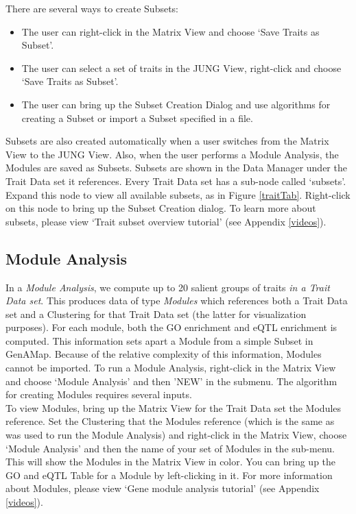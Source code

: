 \documentclass{article}
\begin{document}
There are several ways to create Subsets:

\begin{itemize}
\item The user can right-click in the Matrix View and choose `Save Traits as Subset'. 
\item The user can select a set of traits in the JUNG View, right-click and choose `Save Traits as Subset'. 
\item The user can bring up the Subset Creation Dialog and use algorithms for creating a Subset or import a Subset specified in a file. 
\end{itemize}

Subsets are also created automatically when a user switches from the Matrix View to the JUNG View. Also, when the user performs a Module Analysis, the Modules are saved as Subsets. Subsets are shown in the Data Manager under the Trait Data set it references. Every Trait Data set has a sub-node called `subsets'. Expand this node to view all available subsets, as in Figure \ref{traitTab}. Right-click on this node to bring up the Subset Creation dialog. To learn more about subsets, please view `Trait subset overview tutorial' (see Appendix \ref{videos}).

\subsection{Module Analysis}

In a {\it Module Analysis}, we compute up to 20 salient groups of traits {\it in a Trait Data set}. This produces data of type {\it Modules} which references both a Trait Data set and a Clustering for that Trait Data set (the latter for visualization purposes). For each module, both the GO enrichment and eQTL enrichment is computed. This information sets apart a Module from a simple Subset in GenAMap. Because of the relative complexity of this information, Modules cannot be imported. To run a Module Analysis, right-click in the Matrix View and choose `Module Analysis' and then 'NEW' in the submenu. The algorithm for creating Modules requires several inputs. \\

To view Modules, bring up the Matrix View for the Trait Data set the Modules reference. Set the Clustering that the Modules reference (which is the same as was used to run the Module Analysis) and right-click in the Matrix View, choose `Module Analysis' and then the name of your set of Modules in the sub-menu. This will show the Modules in the Matrix View in color. You can bring up the GO and eQTL Table for a Module by left-clicking in it. For more information about Modules, please view `Gene module analysis tutorial' (see Appendix \ref{videos}).
\end{document}
